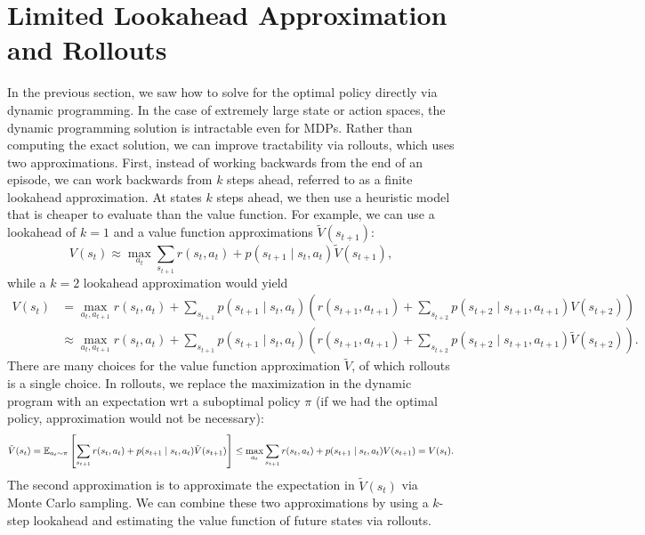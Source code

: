 \documentclass[11pt]{article}
\begin{document}
\section{Limited Lookahead Approximation and Rollouts}
In the previous section, we saw how to solve for the optimal policy directly via dynamic programming.
In the case of extremely large state or action spaces,
the dynamic programming solution is intractable even for MDPs.
Rather than computing the exact solution, we can improve tractability via rollouts,
which uses two approximations.
First, instead of working backwards from the end of an episode, we can work backwards
from $k$ steps ahead, referred to as a finite lookahead approximation.
At states $k$ steps ahead, we then use a heuristic model that is cheaper to evaluate
than the value function.
For example, we can use a lookahead of $k=1$ and a value function approximations $\tilde{V}(s_{t+1})$:
\begin{equation}
V(s_t) \approx \max_{a_t} \sum_{s_{t+1}}r(s_t, a_t) + p(s_{t+1} \mid s_t, a_t)\tilde{V}(s_{t+1}),
\end{equation}
while a $k=2$ lookahead approximation would yield 
\begin{equation}
\begin{aligned}
V(s_t)
&= \max_{a_t, a_{t+1}} r(s_t, a_t) + \sum_{s_{t+1}}p(s_{t+1} \mid s_t, a_t)
\left(r(s_{t+1}, a_{t+1}) + \sum_{s_{t+2}}p(s_{t+2} \mid s_{t+1}, a_{t+1})V(s_{t+2})\right)\\
&\approx \max_{a_t, a_{t+1}} r(s_t, a_t) + \sum_{s_{t+1}}p(s_{t+1} \mid s_t, a_t)
\left(r(s_{t+1}, a_{t+1}) + \sum_{s_{t+2}}p(s_{t+2} \mid s_{t+1}, a_{t+1})\tilde{V}(s_{t+2})\right).
\end{aligned}
\end{equation}
There are many choices for the value function approximation $\tilde{V}$,
of which rollouts is a single choice.
In rollouts, we replace the maximization in the dynamic program with an expectation
wrt a suboptimal policy $\pi$ (if we had the optimal policy, approximation would not be necessary):
\begin{equation}
\tilde{V}(s_t)
=\mathbb{E}_{a_t\sim \pi}\left[\sum_{s_{t+1}}r(s_t, a_t) + p(s_{t+1} \mid s_t, a_t)\tilde{V}(s_{t+1})\right]
\le \max_{a_t} \sum_{s_{t+1}}r(s_t, a_t) + p(s_{t+1} \mid s_t, a_t)V(s_{t+1})
= V(s_t).
\end{equation}
The second approximation is to approximate the expectation in $\tilde{V}(s_t)$
via Monte Carlo sampling.
We can combine these two approximations by using a $k$-step lookahead and estimating
the value function of future states via rollouts.
\end{document}
